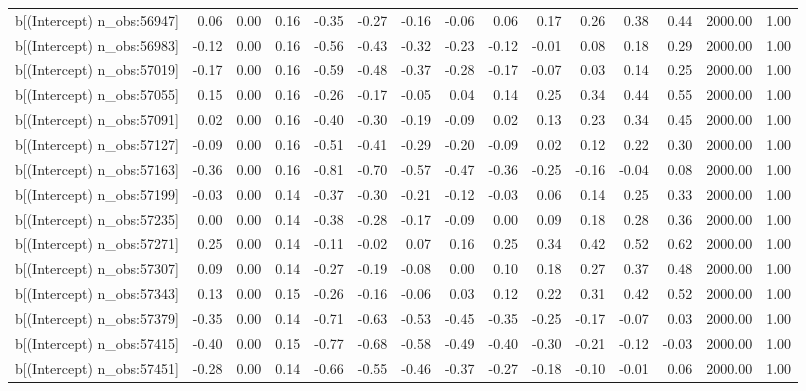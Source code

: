 \begin{table}[ht]
\begin{tabular}{rrrrrrrrrrrrrrr}
  b[(Intercept) n\_obs:56947] & 0.06 & 0.00 & 0.16 & -0.35 & -0.27 & -0.16 & -0.06 & 0.06 & 0.17 & 0.26 & 0.38 & 0.44 & 2000.00 & 1.00 \\ 
  b[(Intercept) n\_obs:56983] & -0.12 & 0.00 & 0.16 & -0.56 & -0.43 & -0.32 & -0.23 & -0.12 & -0.01 & 0.08 & 0.18 & 0.29 & 2000.00 & 1.00 \\ 
  b[(Intercept) n\_obs:57019] & -0.17 & 0.00 & 0.16 & -0.59 & -0.48 & -0.37 & -0.28 & -0.17 & -0.07 & 0.03 & 0.14 & 0.25 & 2000.00 & 1.00 \\ 
  b[(Intercept) n\_obs:57055] & 0.15 & 0.00 & 0.16 & -0.26 & -0.17 & -0.05 & 0.04 & 0.14 & 0.25 & 0.34 & 0.44 & 0.55 & 2000.00 & 1.00 \\ 
  b[(Intercept) n\_obs:57091] & 0.02 & 0.00 & 0.16 & -0.40 & -0.30 & -0.19 & -0.09 & 0.02 & 0.13 & 0.23 & 0.34 & 0.45 & 2000.00 & 1.00 \\ 
  b[(Intercept) n\_obs:57127] & -0.09 & 0.00 & 0.16 & -0.51 & -0.41 & -0.29 & -0.20 & -0.09 & 0.02 & 0.12 & 0.22 & 0.30 & 2000.00 & 1.00 \\ 
  b[(Intercept) n\_obs:57163] & -0.36 & 0.00 & 0.16 & -0.81 & -0.70 & -0.57 & -0.47 & -0.36 & -0.25 & -0.16 & -0.04 & 0.08 & 2000.00 & 1.00 \\ 
  b[(Intercept) n\_obs:57199] & -0.03 & 0.00 & 0.14 & -0.37 & -0.30 & -0.21 & -0.12 & -0.03 & 0.06 & 0.14 & 0.25 & 0.33 & 2000.00 & 1.00 \\ 
  b[(Intercept) n\_obs:57235] & 0.00 & 0.00 & 0.14 & -0.38 & -0.28 & -0.17 & -0.09 & 0.00 & 0.09 & 0.18 & 0.28 & 0.36 & 2000.00 & 1.00 \\ 
  b[(Intercept) n\_obs:57271] & 0.25 & 0.00 & 0.14 & -0.11 & -0.02 & 0.07 & 0.16 & 0.25 & 0.34 & 0.42 & 0.52 & 0.62 & 2000.00 & 1.00 \\ 
  b[(Intercept) n\_obs:57307] & 0.09 & 0.00 & 0.14 & -0.27 & -0.19 & -0.08 & 0.00 & 0.10 & 0.18 & 0.27 & 0.37 & 0.48 & 2000.00 & 1.00 \\ 
  b[(Intercept) n\_obs:57343] & 0.13 & 0.00 & 0.15 & -0.26 & -0.16 & -0.06 & 0.03 & 0.12 & 0.22 & 0.31 & 0.42 & 0.52 & 2000.00 & 1.00 \\ 
  b[(Intercept) n\_obs:57379] & -0.35 & 0.00 & 0.14 & -0.71 & -0.63 & -0.53 & -0.45 & -0.35 & -0.25 & -0.17 & -0.07 & 0.03 & 2000.00 & 1.00 \\ 
  b[(Intercept) n\_obs:57415] & -0.40 & 0.00 & 0.15 & -0.77 & -0.68 & -0.58 & -0.49 & -0.40 & -0.30 & -0.21 & -0.12 & -0.03 & 2000.00 & 1.00 \\ 
  b[(Intercept) n\_obs:57451] & -0.28 & 0.00 & 0.14 & -0.66 & -0.55 & -0.46 & -0.37 & -0.27 & -0.18 & -0.10 & -0.01 & 0.06 & 2000.00 & 1.00 \\ 

\end{tabular}
\end{table}
